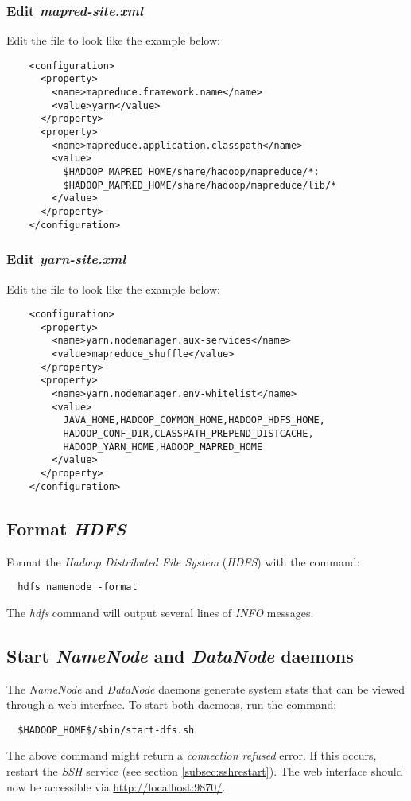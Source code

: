 \documentclass{article}
\begin{document}
    \subsubsection{Edit \emph{mapred-site.xml}}
    Edit the file  to look like the example
    below:
    \begin{verbatim}
    <configuration>
      <property>
        <name>mapreduce.framework.name</name>
        <value>yarn</value>
      </property>
      <property>
        <name>mapreduce.application.classpath</name>
        <value>
          $HADOOP_MAPRED_HOME/share/hadoop/mapreduce/*:
          $HADOOP_MAPRED_HOME/share/hadoop/mapreduce/lib/*
        </value>
      </property>
    </configuration>
    \end{verbatim}
        
    \subsubsection{Edit \emph{yarn-site.xml}}
    Edit the file  to look like the example below:
    \begin{verbatim}
    <configuration>
      <property>
        <name>yarn.nodemanager.aux-services</name>
        <value>mapreduce_shuffle</value>
      </property>
      <property>
        <name>yarn.nodemanager.env-whitelist</name>
        <value>
          JAVA_HOME,HADOOP_COMMON_HOME,HADOOP_HDFS_HOME,
          HADOOP_CONF_DIR,CLASSPATH_PREPEND_DISTCACHE,
          HADOOP_YARN_HOME,HADOOP_MAPRED_HOME
        </value>
      </property>
    </configuration>
    \end{verbatim}

  \subsection{Format \emph{HDFS}}
  Format the \emph{Hadoop Distributed File System} (\emph{HDFS}) with the command:
  \begin{verbatim}
  hdfs namenode -format
  \end{verbatim}
  The \emph{hdfs} command will output several lines of \emph{INFO} messages.

  \subsection{Start \emph{NameNode} and \emph{DataNode} daemons}
  The \emph{NameNode} and \emph{DataNode} daemons generate system stats that can be viewed
  through a web interface. To start both daemons, run the command:
  \begin{verbatim}
  $HADOOP_HOME$/sbin/start-dfs.sh
  \end{verbatim}
  The above command might return a \emph{connection refused} error. If this occurs, restart
  the \emph{SSH} service (see section \ref{subsec:sshrestart}). The web interface should now be
  accessible via \url{http://localhost:9870/}.
\end{document}
